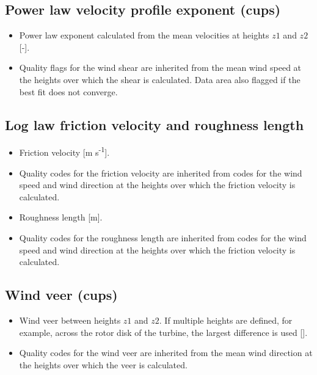 \subsection{Power law velocity profile exponent (cups)}
\begin{itemize}
\item {} Power law exponent calculated from the mean velocities at heights $z1$ and $z2$ [-]. 
\item {} Quality flags for the wind shear are inherited from the mean wind speed at the heights over which the shear is calculated. Data area also flagged if the best fit does not converge.
\end{itemize}

\subsection{Log law friction velocity and roughness length}    
\begin{itemize}
\item {} Friction velocity [m s\textsuperscript{-1}]. 
\item {} Quality codes for the friction velocity are inherited from codes for the wind speed and wind direction at the heights over which the friction velocity is calculated.
\item {} Roughness length [m].
\item {} Quality codes for the roughness length are inherited from codes for the wind speed and wind direction at the heights over which the friction velocity is calculated.
\end{itemize}

\subsection{Wind veer (cups)} 
\begin{itemize}
\item {} Wind veer between heights $z1$ and $z2$. If multiple heights are defined, for example, across the rotor disk of the turbine, the largest difference is used [\degree]. 
\item {} Quality codes for the wind veer are inherited from the mean wind direction at the heights over which the veer is calculated.
\end{itemize}

